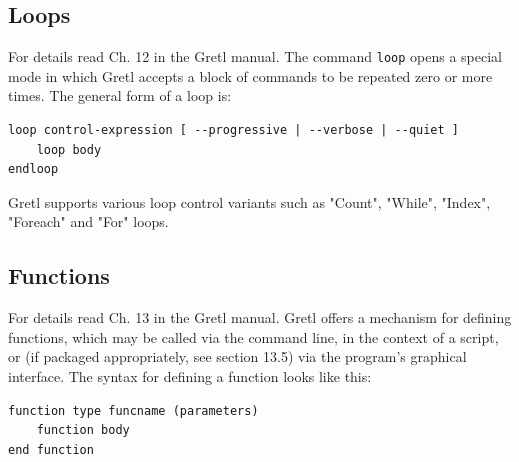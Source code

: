 \documentclass[11pt]{article}
\newcommand{\remph}[1]{{\color{myred}#1}}
\begin{document}

\subsection{Loops}
\label{sec:loops}
For details read Ch. 12 in the Gretl manual. The command \texttt{loop} opens a special mode in which Gretl accepts a block of commands to be repeated zero or more times. The general form of a loop is:
\begin{Verbatim}[baselinestretch=0.75, fontsize=\small, frame=single]
loop control-expression [ --progressive | --verbose | --quiet ]
	loop body
endloop
\end{Verbatim}
Gretl supports various loop control variants such as "Count", "While", "Index", "Foreach" and "For" loops. 

\subsection{Functions}
\label{sec:func}
For details read Ch. 13 in the Gretl manual. Gretl offers a mechanism for defining functions, which may be called via the command line, in the context of a script, or (if packaged appropriately, see section 13.5) via the program’s graphical interface. The syntax for defining a function looks like this:
\begin{Verbatim}[baselinestretch=0.75, fontsize=\small, frame=single]
function type funcname (parameters)
	function body
end function
\end{Verbatim}
\end{document}
